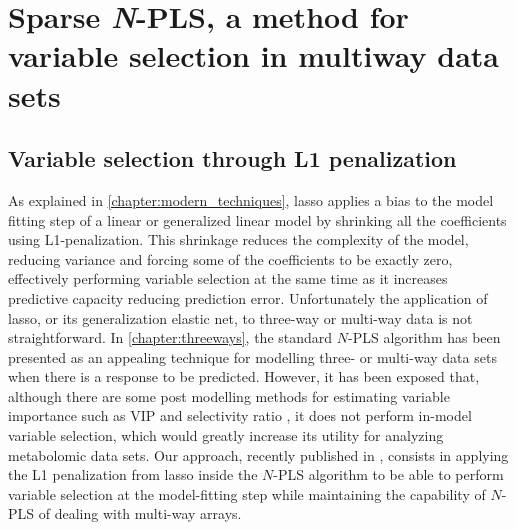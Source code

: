 
\chapter[Sparse \textit{N}-PLS, a method for variable selection in multiway data sets]{Sparse \textit{N}-PLS, a method for variable selection in multiway data sets}



\section{Variable selection through L1 penalization}
As explained in \autoref{chapter:modern_techniques}, lasso applies a bias to the model fitting step of a linear or generalized linear model by shrinking all the coefficients using L1-penalization. This shrinkage reduces the complexity of the model, reducing variance and forcing some of the coefficients to be exactly zero, effectively performing variable selection at the same time as it increases predictive capacity reducing prediction error. Unfortunately the application of lasso, or its generalization elastic net, to three-way or multi-way data is not straightforward. In \autoref{chapter:threeways}, the standard $N$-PLS algorithm has been presented as an appealing technique for modelling three- or multi-way data sets when there is a response to be predicted. However, it has been exposed that, although there are some post modelling methods for estimating variable importance such as VIP \parencite{favilla2013assessing} and selectivity ratio \parencite{rajalahti2009biomarker},  it does not perform in-model variable selection, which would greatly increase its utility for analyzing metabolomic data sets. Our approach, recently published in \parencite{hervas2018sparse}, consists in applying the L1 penalization from lasso inside the $N$-PLS algorithm to be able to perform variable selection at the model-fitting step while maintaining the capability of $N$-PLS of dealing with multi-way arrays. 

